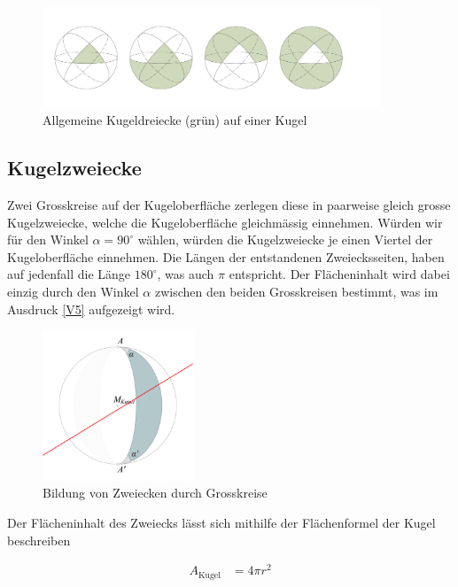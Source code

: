 \begin{refsection}
\begin{figure}[htbp]
\centering
\includegraphics[width=0.9\textwidth]{kugel/Dreiecksarten.jpg}
\caption{Allgemeine Kugeldreiecke (grün) auf einer Kugel}
\end{figure}


\subsection{Kugelzweiecke} 
Zwei Grosskreise auf der Kugeloberfläche zerlegen diese in paarweise gleich grosse Kugelzweiecke, welche die Kugeloberfläche gleichmässig einnehmen. Würden wir für den Winkel 
$\alpha = 90^{\circ}$ wählen, würden die Kugelzweiecke je einen Viertel der Kugeloberfläche einnehmen. Die Längen der entstandenen Zweiecksseiten, haben auf jedenfall die Länge
$180^{\circ}$, was auch $\pi$ entspricht.
Der Flächeninhalt wird dabei einzig durch den Winkel $\alpha$ zwischen den beiden Grosskreisen bestimmt, was im Ausdruck \eqref{V5} aufgezeigt wird.

\begin{figure}[htbp]
\centering
\includegraphics[width=0.4\textwidth]{kugel/Zweieck.jpg}
\caption{Bildung von Zweiecken durch Grosskreise}
\end{figure}

Der Flächeninhalt des Zweiecks lässt sich mithilfe der Flächenformel der Kugel beschreiben

\begin{align*}
A_\text{Kugel} &= 4 \pi r^{2}
\end{align*}


\end{refsection}
